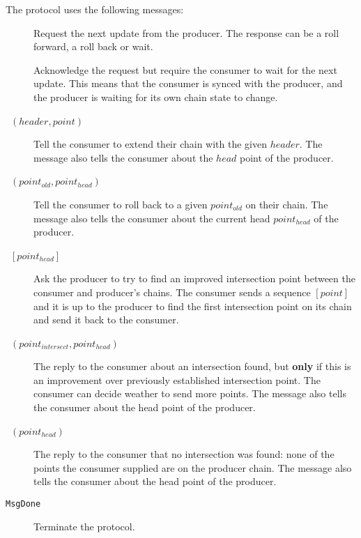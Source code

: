 \documentclass{report}
\newcommand{\msg}[1]{\texttt{#1}}
\newcommand{\MsgDone}{\msg{MsgDone}}
\renewcommand{\langle}{[}
\renewcommand{\rangle}{]}
\theoremstyle{definition}{
  \newtheorem{lemma}{Lemma}[section] %
  \newtheorem{definition}[lemma]{Definition}
}
\theoremstyle{theorem}{
  \newtheorem{invariant}[lemma]{Invariant}
  \newtheorem{proofobligation}[lemma]{Proof Obligation}
}
\numberwithin{equation}{lemma}
\begin{document}
The protocol uses the following messages:
\begin{description}
\item [\RequestNext]
      Request the next update from the producer.
      The response can be a roll forward, a roll back or wait.
\item [\AwaitReply]
      Acknowledge the request but require the consumer to wait for the next update.
      This means that the consumer is synced with the producer, and
      the producer is waiting for its own chain state to change.
\item [\RollForward~{\boldmath $(header,point)$}]
      Tell the consumer to extend their chain with the given $header$.
      The message also tells the consumer about the $head$ point of the producer.
\item [\RollBackward~{\boldmath $(point_{old},point_{head})$}]
      Tell the consumer to roll back to a given $point_{old}$ on their chain.
      The message also tells the consumer about the current head $point_{head}$ of the producer.
\item [\FindIntersect~{\boldmath $\langle point_{head} \rangle $}]
      Ask the producer to try to find an improved intersection point between
      the consumer and producer's chains.
      The consumer sends a sequence {\boldmath $\langle point \rangle $}
      and it is up to the producer
      to find the first intersection point on its chain and send it back to the consumer.
\item [\IntersectImproved~{\boldmath $(point_{intersect},point_{head})$}]
      The reply to the consumer about an intersection found, but {\bf only} if this
      is an improvement over previously established intersection point.
      The consumer can decide weather to send more points.
      The message also tells the consumer about the head point of the producer.
\item [\IntersectUnchanged~{\boldmath $(point_{head})$}]
      The reply to the consumer that no intersection was found: none of the
      points the consumer supplied are on the producer chain.
      The message also tells the consumer about the head point of the producer.
\item [\MsgDone]
      Terminate the protocol.
\end{description}
\end{document}
